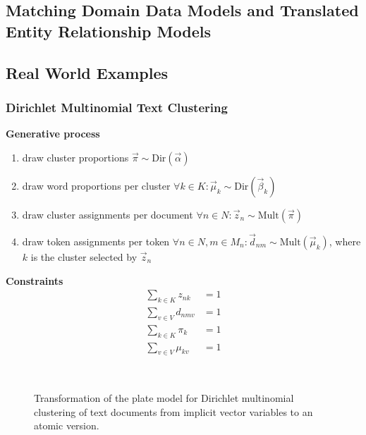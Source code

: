 \subsection{Matching Domain Data Models and Translated Entity Relationship Models}

\subsection{Real World Examples}

\subsubsection{Dirichlet Multinomial Text Clustering}

\textbf{Generative process}
\begin{enumerate}
\item draw cluster proportions $\vec \pi \sim \text{Dir}(\vec \alpha)$
\item draw word proportions per cluster $\forall k \in K: \vec \mu_k \sim \text{Dir}(\vec \beta_k)$
\item draw cluster assignments per document $\forall n \in N: \vec z_n \sim \text{Mult}(\vec \pi)$
\item draw token assignments per token $\forall n \in N, m \in M_n: \vec d_{nm} \sim \text{Mult}(\vec \mu_k)$, where $k$ is the cluster selected by $\vec z_n$
\end{enumerate}

\textbf{Constraints}
\begin{align}
\sum_{k \in K} z_{nk} &= 1\\
\sum_{v \in V} d_{nmv} &= 1\\
\sum_{k \in K} \pi_{k} &= 1\\
\sum_{v \in V} \mu_{kv} &= 1
\end{align}

\begin{figure}[t]
\begin{minipage}[t]{0.49\linewidth}
	\begin{center}
	\end{center}
\end{minipage}
\hspace{0.0cm}
\begin{minipage}[t]{0.49\linewidth}
	\begin{center}
	\end{center}
\end{minipage}\\
\caption{Transformation of the plate model for Dirichlet multinomial clustering of text documents from implicit vector variables to an atomic version.}
\label{img:clustering_platemodels}
\end{figure}

